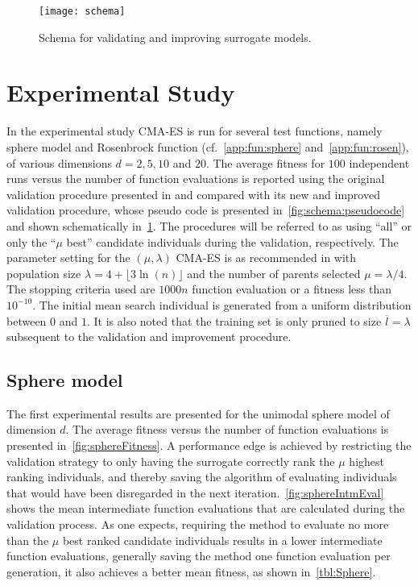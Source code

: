 \begin{figure} \centering 
	\texttt{[image: schema]}
	\caption{Schema for validating and improving surrogate models.}\label{fig:schema} 
\end{figure}


\section{Experimental Study}\label{sec:sur:expr}
In the experimental study CMA-ES  is run for several test functions, namely sphere model and Rosenbrock function (cf.~\cref{app:fun:sphere} and~\cref{app:fun:rosen}), of various dimensions $d=2,5,10$ and $20$. The average fitness for $100$ independent runs versus the number of function evaluations is reported using the original validation procedure presented in \cite{Ru06:PPSN} and compared with its new and improved validation procedure, whose pseudo code is presented in~\cref{fig:schema:pseudocode} and shown schematically in~\cref{fig:schema}. The procedures will be referred to as using ``all'' or only the ``$\mu$ best'' candidate individuals during the validation, respectively.
The parameter setting for the $(\mu,\lambda)$ CMA-ES is as recommended in \cite{Hansen01} with population size $\lambda = 4+\lfloor 3\ln(n)\rfloor$ and the number of parents selected $\mu=\lambda/4$. The stopping criteria used are $1000n$ function evaluation or a fitness less than $10^{-10}$. The initial mean search individual is generated from a uniform distribution between $0$ and $1$. It is also noted that the training set is only pruned to size $\overline{l} = \lambda$ subsequent to the validation and improvement procedure.

\subsection{Sphere model}\label{sec:sphere}
The first experimental results are presented for the unimodal sphere model of dimension $d$.  
The average fitness versus the number of function evaluations is presented in~\cref{fig:sphereFitness}. A performance edge is achieved by restricting the validation strategy to only having the surrogate correctly rank the $\mu$ highest ranking individuals, and thereby saving the algorithm of evaluating individuals  that would have been disregarded in the next iteration.~\cref{fig:sphereIntmEval} shows the mean intermediate function evaluations that are calculated during the validation process. As one expects, requiring the method to evaluate no more than the $\mu$ best ranked candidate individuals results in a lower intermediate function evaluations, generally saving the method one function evaluation per generation, it also achieves a better mean fitness, as shown in~\cref{tbl:Sphere}.

